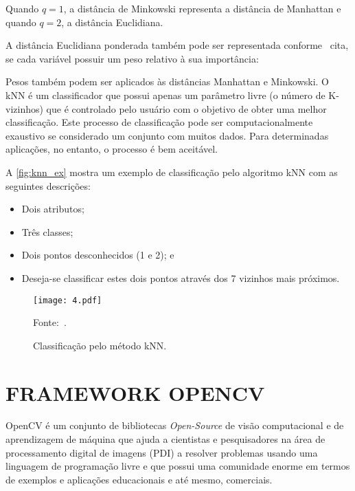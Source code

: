 Quando $q = 1$, a distância de Minkowski representa a distância de Manhattan e quando $q = 2$, a distância Euclidiana.

A distância Euclidiana ponderada também pode ser representada conforme~ cita, se cada variável possuir um peso relativo à sua importância:

\begin{citacao}
	
	Pesos também podem ser aplicados às distâncias Manhattan e Minkowski. O kNN é um classificador que possui apenas um parâmetro livre (o número de K-vizinhos) que é controlado pelo usuário com o objetivo de obter uma melhor classificação. Este processo de classificação pode ser computacionalmente exaustivo se considerado um conjunto com muitos dados. Para determinadas aplicações, no entanto, o processo é bem aceitável.	

\end{citacao}

A \autoref{fig:knn_ex} mostra um exemplo de classificação pelo algoritmo kNN com as seguintes descrições:

\begin{itemize}
	\item Dois atributos;
	\item Três classes;
	\item Dois pontos desconhecidos (1 e 2); e
	\item Deseja-se classificar estes dois pontos através dos 7 vizinhos mais próximos.
\end{itemize}

\begin{figure}[htb]
	\centering
	\caption{{\footnotesize Classificação pelo método kNN.}}   %
	\label{fig:knn_ex}
	\texttt{[image: 4.pdf]}
	
	{\footnotesize Fonte:~.}
\end{figure}

\section{\uppercase{Framework OpenCV}}

OpenCV é um conjunto de bibliotecas \emph{Open-Source} de visão computacional e de aprendizagem de máquina \cite{pavalenko2017} que ajuda a cientistas e pesquisadores na área de processamento digital de imagens (PDI) a resolver problemas usando uma linguagem de programação livre e que possui uma comunidade enorme em termos de exemplos e aplicações educacionais e até mesmo, comerciais.

